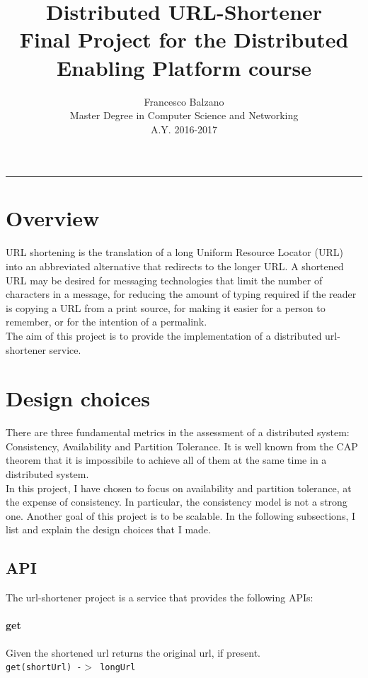 \documentclass{article}
\title{ \textbf {\vspace{0.5cm}\Huge Distributed URL-Shortener \\}
 Final Project for the Distributed Enabling Platform course \vspace{1.0cm}\\}
\date{\vspace{2cm}}
\author{ \Large Francesco Balzano \vspace{0.3cm}\\ 
\Large Master Degree in Computer Science and Networking \vspace{0.4cm} \\
\Large A.Y. 2016-2017 
}
\begin{document}
  \maketitle
  \noindent\rule{18cm}{0.4pt}
  \tableofcontents
  \newpage

\clearpage
\setcounter{page}{2}
  
\section{Overview}  
URL shortening is the translation of a long Uniform Resource Locator (URL) into an abbreviated alternative that redirects to the longer URL.  A shortened URL may be desired for messaging technologies that limit the number of characters in a message, for reducing the amount of typing required if the reader is copying a URL from a print source, for making it easier for a person to remember, or for the intention of a permalink.\\  
The aim of this project is to provide the implementation of a distributed url-shortener service.


\section{Design choices}
There are three fundamental metrics in the assessment of a distributed system: Consistency, Availability and Partition Tolerance. It is well known from the CAP theorem that it is impossibile to achieve all of them at the same time in a distributed system. \\ 
In this project, I have chosen to focus on availability and partition tolerance, at the expense of consistency. In particular, the consistency model is not a strong one. Another goal of this project is to be scalable.
In the following subsections, I list and explain the design choices that I made.


\subsection{API}
The url-shortener project is a service that provides the following APIs:

\paragraph{get}
Given the shortened url returns the original url, if present. \\
\texttt{get(shortUrl) -$>$ longUrl}
\end{document}
